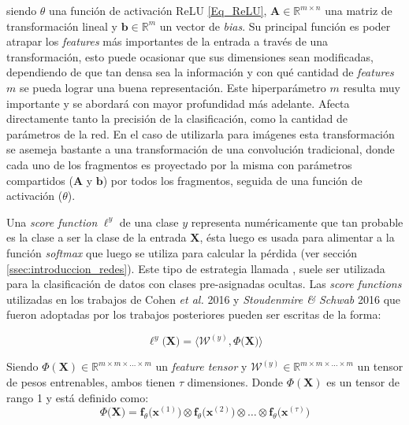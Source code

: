 \documentclass[spanish]{article}
\theoremstyle{definition}
\theoremstyle{remark}
\numberwithin{equation}{section}
\numberwithin{equation}{section} %
\begin{document}
siendo $\theta$ una función de activación ReLU \eqref{Eq_ReLU}, $\boldsymbol{A} \in \mathbb{R}^{m \times n}$ una matriz de transformación lineal y $\boldsymbol{b} \in \mathbb{R}^{m}$ un vector de \textit{bias}. Su principal función es poder atrapar los \textit{features} más importantes de la entrada a través de una transformación, esto puede ocasionar que sus dimensiones sean modificadas, dependiendo de que tan densa sea la información y con qué cantidad de \textit{features} $m$ se pueda lograr una buena representación. Este hiperparámetro $m$ resulta muy importante y se abordará con mayor profundidad más adelante. Afecta directamente tanto la precisión de la clasificación, como la cantidad de parámetros de la red. En el caso de utilizarla para imágenes esta transformación se asemeja bastante a una transformación de una convolución tradicional, donde cada uno de los fragmentos es proyectado por la misma con parámetros compartidos ($\boldsymbol{A}$ y $\boldsymbol{b}$) por todos los fragmentos, seguida de una función de activación ($\theta$). \par 
Una \textit{score function} $\ell^y$ de una clase $y$ representa numéricamente que tan probable es la clase a ser la clase de la entrada $\boldsymbol{X}$, ésta luego es usada para alimentar a la función \textit{softmax} que luego se utiliza para calcular la pérdida (ver sección \ref{ssec:introduccion_redes}). Este tipo de estrategia llamada , suele  ser utilizada para la clasificación de datos con clases pre-asignadas ocultas. Las \textit{score functions} utilizadas en los trabajos de Cohen \textit{ et al.} 2016 \cite{cohen2016expressive} y \textit{Stoudenmire \& Schwab} 2016 \cite{stoudenmire2016supervised}  que fueron adoptadas por los trabajos posteriores pueden ser escritas de la forma: \par
\begin{equation}
\label{eq_score_function}
\ell^y\big(\boldsymbol{X}\big)=\Bigg\langle \mathcal{W}^{(y)} , \mathit{\Phi}\Big(\boldsymbol{X}\Big) \Bigg\rangle
\end{equation}\par
Siendo $\mathit{\Phi}(\boldsymbol{X}) \in \mathbb{R}^{m \times m \times  \ldots \times m}$ un \textit{feature tensor} y $\mathcal{W}^{(y)} \in \mathbb{R}^{m \times m \times  \ldots \times m}$ un tensor de pesos entrenables, ambos tienen $\tau$ dimensiones. Donde $\mathit{\Phi}(\boldsymbol{X})$ es un tensor de rango 1 y está definido como:
\begin{equation}
\label{eq_feature_tensor}
\mathit{\Phi}\Big(\boldsymbol{X}\Big)=\boldsymbol{f}_\theta\Big(\boldsymbol{x}^{(1)}\Big) \otimes \boldsymbol{f}_\theta\Big(\boldsymbol{x}^{(2)}\Big) \otimes \dots \otimes \boldsymbol{f}_\theta\Big(\boldsymbol{x}^{(\tau)}\Big) 
\end{equation}\par
\end{document}
